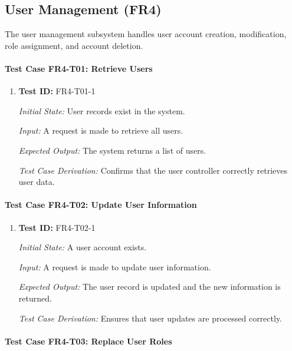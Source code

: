 \documentclass[12pt, titlepage]{article}
\begin{document}
\subsection{User Management (FR4)}

The user management subsystem handles user account creation, modification, role assignment, and account deletion.

\paragraph{Test Case FR4-T01: Retrieve Users}

\begin{enumerate}

\item \textbf{Test ID:} FR4-T01-1

\textit{Initial State:} User records exist in the system.

\textit{Input:} A request is made to retrieve all users.

\textit{Expected Output:} The system returns a list of users.

\textit{Test Case Derivation:} Confirms that the user controller correctly retrieves user data.

\end{enumerate}


\paragraph{Test Case FR4-T02: Update User Information}

\begin{enumerate}

\item \textbf{Test ID:} FR4-T02-1

\textit{Initial State:} A user account exists.

\textit{Input:} A request is made to update user information.

\textit{Expected Output:} The user record is updated and the new information is returned.

\textit{Test Case Derivation:} Ensures that user updates are processed correctly.

\end{enumerate}


\paragraph{Test Case FR4-T03: Replace User Roles}
\end{document}
